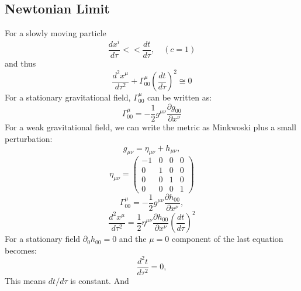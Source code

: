 \documentclass{ttuthes2007}
\begin{document}
\subsection{Newtonian Limit}
	For a slowly moving particle 
\begin{equation}
\frac{dx^i}{d\tau}<< \frac{dt}{d\tau},\quad (c=1)
\end{equation}
and thus
\begin{equation}
\frac{d^2x^\mu}{d\tau^2}+\Gamma^\mu_{00}\left(\frac{dt}{d\tau}\right)^2
\cong 0
\end{equation}
For a stationary gravitational field, $\Gamma^\mu_{00}$ can be written as:
\begin{equation}
\Gamma^\mu_{00}= -\frac{1}{2} g^{\mu \nu} \frac{\partial g_{00}}{\partial x^\nu}
\end{equation}	
For a weak gravitational field, we can write the metric as Minkwoski plus a small
perturbation:
\begin{equation}
g_{\mu \nu}= \eta_{\mu \nu} + h_{\mu \nu},
\end{equation}
\begin{equation*}
\eta_{\mu\nu}=
 \begin{pmatrix}
    -1 & 0 & 0 & 0 \\
    0 & 1 & 0 & 0 \\
    0 & 0 & 1 & 0 \\
    0 & 0 & 0 & 1 
 \end{pmatrix}
\end{equation*}
\begin{equation}
\Gamma^\mu_{00}= -\frac{1}{2} g^{\mu \nu} \frac{\partial h_{00}}{\partial x^\nu},
\end{equation}	
\begin{equation}
\frac{d^2x^\mu}{d\tau^2}=\frac{1}{2} \eta^{\mu \nu} \frac{\partial h_{00}}{\partial x^\nu}
\left(\frac{dt}{d\tau}\right)^2
\end{equation}
For a stationary field $\partial_0h_{00}=0$ and the $\mu=0$ component of
the last equation becomes:
\begin{equation}
\frac{d^2t}{d\tau^2}=0,
\end{equation}
This means $dt/d\tau$ is constant. And
\end{document}
